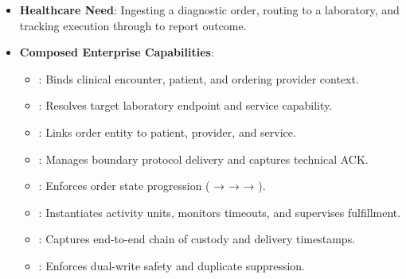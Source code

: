 \begin{itemize}

\item 
\textbf{Healthcare Need}: Ingesting a diagnostic order, routing to a laboratory, and tracking execution through to report outcome.



\item 
\textbf{Composed Enterprise Capabilities}:


\begin{itemize}

\item 
\texttt{}: Binds clinical encounter, patient, and ordering provider context.



\item 
\texttt{}: Resolves target laboratory endpoint and service capability.



\item 
\texttt{}: Links order entity to patient, provider, and service.



\item 
\texttt{}: Manages boundary protocol delivery and captures technical ACK.



\item 
\texttt{}: Enforces order state progression (\texttt{} → \texttt{} → \texttt{} → \texttt{}).



\item 
\texttt{}: Instantiates activity units, monitors timeouts, and supervises fulfillment.



\item 
\texttt{}: Captures end-to-end chain of custody and delivery timestamps.



\item 
\texttt{}: Enforces dual-write safety and duplicate suppression.



\end{itemize}


\end{itemize}
\label{rad:enterprise:303}
